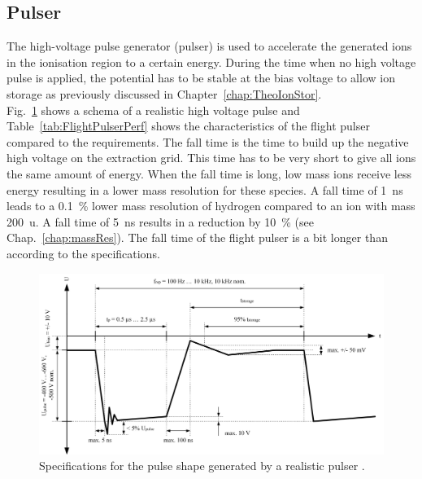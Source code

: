 	\subsection{Pulser} \label{chap:ExpPulser}
	The high-voltage pulse generator (pulser) is used to accelerate the generated ions in the ionisation region to a certain energy. During the time when no high voltage pulse is applied, the potential has to be stable at the bias voltage to allow ion storage as previously discussed in Chapter~\ref{chap:TheoIonStor}.\\
	Fig.~\ref{fig:PulserTheoCurve} shows a schema of a realistic high voltage pulse and Table~\ref{tab:FlightPulserPerf} shows the characteristics of the flight pulser compared to the requirements. The fall time is the time to build up the negative high voltage on the extraction grid. This time has to be very short to give all ions the same amount of energy. When the fall time is long, low mass ions receive less energy resulting in a lower mass resolution for these species. A fall time of 1~ns leads to a 0.1~\% lower mass resolution of hydrogen compared to an ion with mass 200~u. A fall time of 5~ns results in a reduction by 10~\% (see Chap.~\ref{chap:massRes}). The fall time of the flight pulser is a bit longer than according to the specifications.\\
	\begin{figure}[H]
		\centering
		\includegraphics[width=\textwidth]{Bilder/Pulser_theretical_shape.jpg}
		\caption{Specifications for the pulse shape generated by a realistic pulser \cite{Diss_Meyer}.}
		\label{fig:PulserTheoCurve}
	\end{figure}
	\pagebreak
